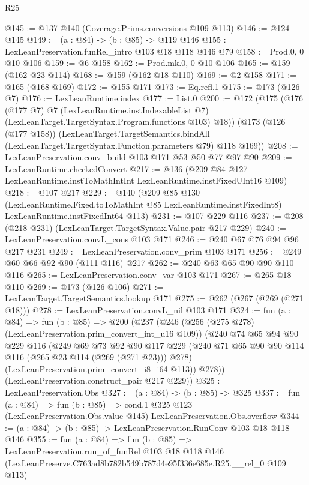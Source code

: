 \begin{lexlean}{R25}
\begin{coremodule}
@145 := @137 @140 (Coverage.Prims.conversions @109 @113)
@146 := @124 @145
@149 := (a : @84) -> (b : @85) -> @119 @146
@155 := LexLeanPreservation.funRel_intro @103 @18 @118 @146 @79
@158 := Prod.{0, 0} @10 @106
@159 := @6 @158
@162 := Prod.mk.{0, 0} @10 @106
@165 := @159 (@162 @23 @114)
@168 := @159 (@162 @18 @110)
@169 := @2 @158
@171 := @165 (@168 @169)
@172 := @155 @171
@173 := Eq.refl.{1}
@175 := @173 (@126 @7)
@176 := LexLeanRuntime.index
@177 := List.{0}
@200 := @172
    (@175
      (@176
        (@177 @7)
        @7
        (LexLeanRuntime.instIndexableList @7)
        (LexLeanTarget.TargetSyntax.Program.functions @103)
        @18))
    (@173
      (@126 (@177 @158))
      (LexLeanTarget.TargetSemantics.bindAll
        (LexLeanTarget.TargetSyntax.Function.parameters @79)
        @118
        @169))
@208 := LexLeanPreservation.conv_build @103 @171 @53 @50 @77 @97 @90
@209 := LexLeanRuntime.checkedConvert
@217 := @136 (@209 @84 @127 LexLeanRuntime.instToMathIntInt LexLeanRuntime.instFixedUInt16 @109)
@218 := @107 @217
@229 := @140
    (@209
      @85
      @130
      (LexLeanRuntime.Fixed.toToMathInt @85 LexLeanRuntime.instFixedInt8)
      LexLeanRuntime.instFixedInt64
      @113)
@231 := @107 @229 @116
@237 := @208 (@218 @231) (LexLeanTarget.TargetSyntax.Value.pair @217 @229)
@240 := LexLeanPreservation.convL_cons @103 @171
@246 := @240 @67 @76 @94 @96 @217 @231
@249 := LexLeanPreservation.conv_prim @103 @171
@256 := @249 @60 @66 @92 @90 (@111 @116) @217
@262 := @240 @63 @65 @90 @90 @110 @116
@265 := LexLeanPreservation.conv_var @103 @171
@267 := @265 @18 @110
@269 := @173 (@126 @106)
@271 := LexLeanTarget.TargetSemantics.lookup @171
@275 := @262 (@267 (@269 (@271 @18)))
@278 := LexLeanPreservation.convL_nil @103 @171
@324 := fun (a : @84) =>
  fun (b : @85) =>
  @200
    (@237
      (@246
        (@256 (@275 @278) (LexLeanPreservation.prim_convert_int_u16 @109))
        (@240
          @74
          @65
          @94
          @90
          @229
          @116
          (@249
            @69
            @73
            @92
            @90
            @117
            @229
            (@240 @71 @65 @90 @90 @114 @116 (@265 @23 @114 (@269 (@271 @23))) @278)
            (LexLeanPreservation.prim_convert_i8_i64 @113))
          @278))
      (LexLeanPreservation.construct_pair @217 @229))
@325 := LexLeanPreservation.Obs
@327 := (a : @84) -> (b : @85) -> @325
@337 := fun (a : @84) =>
  fun (b : @85) =>
  cond.{1} @325 @123 (LexLeanPreservation.Obs.value @145) LexLeanPreservation.Obs.overflow
@344 := (a : @84) -> (b : @85) -> LexLeanPreservation.RunConv @103 @18 @118 @146
@355 := fun (a : @84) =>
  fun (b : @85) =>
  LexLeanPreservation.run_of_funRel
    @103
    @18
    @118
    @146
    (LexLeanPreserve.C763ad8b782b549b787d4e95f336e685e.R25.__rel_0 @109 @113)
\end{coremodule}
\end{lexlean}
